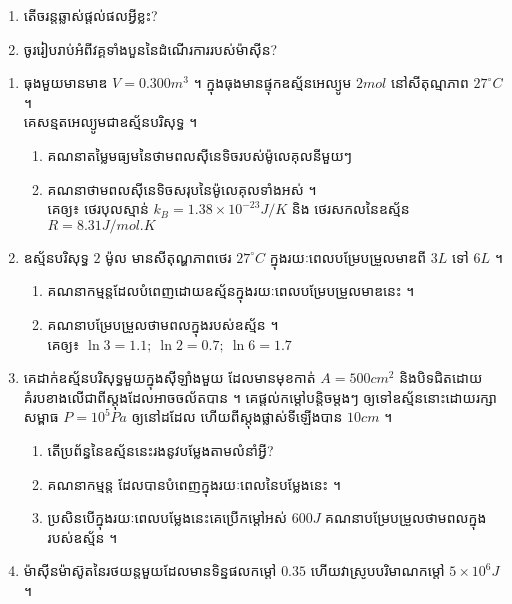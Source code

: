 \documentclass{officialexam}
\begin{document}
	{\maketitle}
		\begin{enumerate}[k,2]
			\item តើចរន្តឆ្លាស់ផ្តល់ផលអ្វីខ្លះ?
			\item ចូររៀបរាប់អំពីវគ្គទាំងបួននៃដំណើរការរបស់ម៉ាស៊ីន?
		\end{enumerate}
	\begin{enumerate}[I]
		\item ធុងមួយមានមាឌ $V=0.300 m^3$ ។ ក្នុងធុងមានផ្ទុកឧស្ម័នអេល្យូម $2 mol$ នៅសីតុណ្មភាព $27^\circ C$ ។\\ គេសន្មតអេល្យូមជាឧស្ម័នបរិសុទ្ធ ។
		\begin{enumerate}[k]
			\item គណនាតម្លៃមធ្យមនៃថាមពលស៊ីនេទិចរបស់ម៉ូលេគុលនីមួយៗ 
			\item គណនាថាមពលស៊ីនេទិចសរុបនៃម៉ូលេគុលទាំងអស់ ។\\ គេឲ្យ៖ ថេរបុលស្មាន់ $k_B=1.38\times10^{-23} J/K$ និង ថេរសកលនៃឧស្ម័ន $R=8.31 J/mol.K$
		\end{enumerate}
		\item ឧស្ម័នបរិសុទ្ធ $2$ ម៉ូល មានសីតុណ្ហភាពថេរ $27^\circ C$ ក្នុងរយៈពេលបម្រែបម្រួលមាឌពី $3 L$ ទៅ $6 L$ ។
		\begin{enumerate}[k]
			\item គណនាកម្មន្តដែលបំពេញដោយឧស្ម័នក្នុងរយៈពេលបម្រែបម្រួលមាឌនេះ ។
			\item គណនាបម្រែបម្រួលថាមពលក្នុងរបស់ឧស្ម័ន ។\\
			 គេឲ្យ៖ $\ln3=1.1;~\ln2=0.7;~\ln6=1.7$
		\end{enumerate}
		\item គេដាក់ឧស្ម័នបរិសុទ្ធមួយក្នុងស៊ីឡាំងមួយ ដែលមានមុខកាត់ $A=500 cm^2$ និងបិទជិតដោយគំរបខាងលើជាពីស្តុងដែលអាចចល័តបាន ។ គេផ្តល់កម្តៅបន្តិចម្ដងៗ ឲ្យទៅឧស្ម័ននោះដោយរក្សាសម្ពាធ $P=10^5 Pa$ ឲ្យនៅដដែល ហើយពីស្តុងផ្លាស់ទីឡើងបាន $10 cm$ ។
		\begin{enumerate}[k]
			\item តើប្រព័ន្ធនៃឧស្ម័ននេះរងនូវបម្លែងតាមលំនាំអ្វី?
			\item គណនាកម្មន្ត ដែលបានបំពេញក្នុងរយៈពេលនៃបម្លែងនេះ ។
			\item ប្រសិនបើក្នុងរយៈពេលបម្លែងនេះគេប្រើកម្តៅអស់ $600 J$ គណនាបម្រែបម្រួលថាមពលក្នុងរបស់ឧស្ម័ន ។
		\end{enumerate}
		\item ម៉ាស៊ីនម៉ាស៊ូតនៃរថយន្តមួយដែលមានទិន្នផលកម្តៅ $0.35$ ហើយវាស្រូបបរិមាណកម្តៅ $5\times10^6 J$ ។

\end{enumerate}
\end{document}
